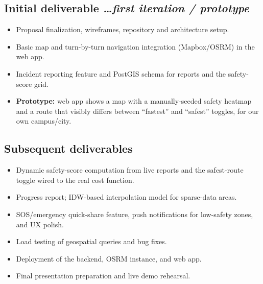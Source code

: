 \documentclass[11pt,a4paper]{article}
\newcommand{\BvrHint}[1]{%
  {\normalfont\normalsize\itshape\hfill #1}}
\begin{document}
\subsection{Initial deliverable %
\BvrHint{\ldots first iteration / prototype}}
\begin{itemize}[leftmargin=0.7cm]
    \item Proposal finalization, wireframes, repository and
    architecture setup.
    \item Basic map and turn-by-turn navigation integration
    (Mapbox/OSRM) in the web app.
    \item Incident reporting feature and PostGIS schema for
    reports and the safety-score grid.
    \item \textbf{Prototype:} web app shows a map with a
    manually-seeded safety heatmap and a route that visibly
    differs between ``fastest'' and ``safest'' toggles, for our
    own campus/city.
\end{itemize}

\subsection{Subsequent deliverables}
\begin{itemize}[leftmargin=0.7cm]
    \item Dynamic safety-score computation from live reports and
    the safest-route toggle wired to the real cost function.
    \item Progress report; IDW-based interpolation model for
    sparse-data areas.
    \item SOS/emergency quick-share feature, push notifications
    for low-safety zones, and UX polish.
    \item Load testing of geospatial queries and bug fixes.
    \item Deployment of the backend, OSRM instance, and web app.
    \item Final presentation preparation and live demo
    rehearsal.
\end{itemize}
\end{document}
